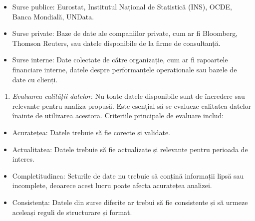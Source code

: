 \documentclass[
  11pt,
  b5paper,
  nottoc]{book}
\providecommand{\tightlist}{%
  \setlength{\itemsep}{0pt}\setlength{\parskip}{0pt}}\usepackage{longtable,booktabs,array}
\begin{document}
\begin{itemize}
\tightlist
\item
  Surse publice: Eurostat, Institutul Național de Statistică (INS),
  OCDE, Banca Mondială, UNData.\\
\item
  Surse private: Baze de date ale companiilor private, cum ar fi
  Bloomberg, Thomson Reuters, sau datele disponibile de la firme de
  consultanță.\\
\item
  Surse interne: Date colectate de către organizație, cum ar fi
  rapoartele financiare interne, datele despre performanțele
  operaționale sau bazele de date cu clienți.
\end{itemize}

\begin{enumerate}
\def\labelenumi{\arabic{enumi}.}
\setcounter{enumi}{2}
\tightlist
\item
  \emph{Evaluarea calității datelor}. Nu toate datele disponibile sunt
  de încredere sau relevante pentru analiza propusă. Este esențial să se
  evalueze calitatea datelor înainte de utilizarea acestora. Criteriile
  principale de evaluare includ:\\
\end{enumerate}

\begin{itemize}
\tightlist
\item
  Acuratețea: Datele trebuie să fie corecte și validate.\\
\item
  Actualitatea: Datele trebuie să fie actualizate și relevante pentru
  perioada de interes.\\
\item
  Completitudinea: Seturile de date nu trebuie să conțină informații
  lipsă sau incomplete, deoarece acest lucru poate afecta acuratețea
  analizei.\\
\item
  Consistența: Datele din surse diferite ar trebui să fie consistente și
  să urmeze aceleași reguli de structurare și format.
\end{itemize}
\end{document}
